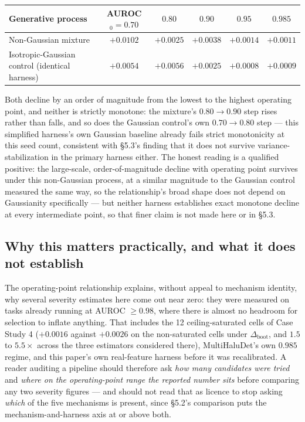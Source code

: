 \documentclass[10pt]{article} %
\begin{document}
\begin{center}\small
\begin{tabular}{lccccc}
\toprule
Generative process & AUROC$_0=0.70$ & $0.80$ & $0.90$ & $0.95$ & $0.985$ \\
\midrule
Non-Gaussian mixture & $+0.0102$ & $+0.0025$ & $+0.0038$ & $+0.0014$ & $+0.0011$ \\
Isotropic-Gaussian control (identical harness) & $+0.0054$ & $+0.0056$ & $+0.0025$ & $+0.0008$ & $+0.0009$ \\
\bottomrule
\end{tabular}
\end{center}

Both decline by an order of magnitude from the lowest to the highest operating
point, and neither is strictly monotone: the mixture's $0.80\to0.90$ step
rises rather than falls, and so does the Gaussian control's own
$0.70\to0.80$ step --- this simplified harness's own Gaussian baseline
already fails strict monotonicity at this seed count, consistent with §5.3's
finding that it does not survive variance-stabilization in the primary
harness either. The honest reading is a qualified positive: the large-scale,
order-of-magnitude decline with operating point survives under this
non-Gaussian process, at a similar magnitude to the Gaussian control measured
the same way, so the relationship's broad shape does not depend on
Gaussianity specifically --- but neither harness establishes exact monotone
decline at every intermediate point, so that finer claim is not made here or
in §5.3.

\subsection{Why this matters practically, and what it does not establish}

The operating-point relationship explains, without appeal to mechanism
identity, why several severity estimates here come out near zero: they were
measured on tasks already running at AUROC $\geq0.98$, where there is almost no
headroom for selection to inflate anything. That includes the 12
ceiling-saturated cells of Case Study 4 ($+0.0016$ against $+0.0026$ on the
non-saturated cells under $\Delta_{\text{boot}}$, and $1.5$ to $5.5\times$
across the three estimators considered there), MultiHaluDet's own $0.985$
regime, and this paper's own real-feature harness before it was recalibrated. A
reader auditing a pipeline should therefore ask \emph{how many candidates were
tried} and \emph{where on the operating-point range the reported number sits}
before comparing any two severity figures --- and should not read that as
licence to stop asking \emph{which} of the five mechanisms is present, since
§5.2's comparison puts the mechanism-and-harness axis at or above both.
\end{document}
